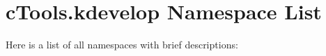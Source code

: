 \section{c\-Tools.kdevelop Namespace List}
Here is a list of all namespaces with brief descriptions:\begin{CompactList}
\item{}
\item{}
\end{CompactList}
